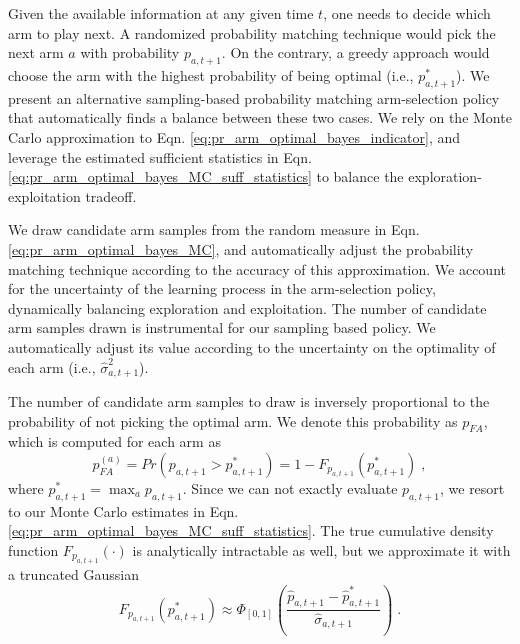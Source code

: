 \documentclass{article}
\newcommand{\ie}{i.e., }
\begin{document}
Given the available information at any given time $t$, one needs to decide which arm to play next. A randomized probability matching technique would pick the next arm $a$ with probability $p_{a,t+1}$. On the contrary, a greedy approach would choose the arm with the highest probability of being optimal (\ie $p^*_{a,t+1}$). We present an alternative sampling-based probability matching arm-selection policy that automatically finds a balance between these two cases. We rely on the Monte Carlo approximation to Eqn. \ref{eq:pr_arm_optimal_bayes_indicator}, and leverage the estimated sufficient statistics in Eqn. \ref{eq:pr_arm_optimal_bayes_MC_suff_statistics} to balance the exploration-exploitation tradeoff. 

We draw candidate arm samples from the random measure in Eqn. \ref{eq:pr_arm_optimal_bayes_MC}, and automatically adjust the probability matching technique according to the accuracy of this approximation. We account for the uncertainty of the learning process in the arm-selection policy, dynamically balancing exploration and exploitation. The number of candidate arm samples drawn is instrumental for our sampling based policy. We automatically adjust its value according to the uncertainty on the optimality of each arm (\ie $\hat{\sigma}^2_{a,t+1}$).

The number of candidate arm samples to draw is inversely proportional to the probability of not picking the optimal arm. We denote this probability as $p_{FA}$, which is computed for each arm as
\begin{equation}
p_{FA}^{(a)} =Pr\left(p_{a,t+1} > p^*_{a,t+1} \right) = 1 - F_{p_{a,t+1}}(p^*_{a,{t+1}}) \; ,
\end{equation}
where $p_{a,t+1}^*=\max_{a}p_{a,t+1}$. Since we can not exactly evaluate $p_{a,t+1}$, we resort to our Monte Carlo estimates in Eqn. \ref{eq:pr_arm_optimal_bayes_MC_suff_statistics}. The true cumulative density function $F_{p_{a,t+1}}(\cdot)$ is analytically intractable as well, but we approximate it with a truncated Gaussian
\begin{equation}
F_{p_{a,t+1}}(p^*_{a,{t+1}}) \approx \Phi_{[0,1]}\left(\frac{\hat{p}_{a,t+1} - \hat{p}^*_{a,{t+1}}}{\hat{\sigma}_{a,t+1}}\right) \;.
\end{equation}
\end{document}

